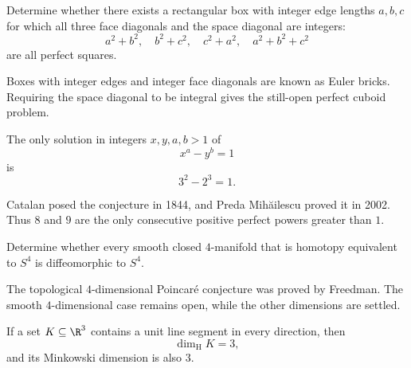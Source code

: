     \begin{openproblem}
        Determine whether there exists a rectangular box with integer edge
        lengths $a,b,c$ for which all three face diagonals and the space
        diagonal are integers:
        \[
            a^2+b^2,\quad
            b^2+c^2,\quad
            c^2+a^2,\quad
            a^2+b^2+c^2
        \]
        are all perfect squares.
    \end{openproblem}

    \begin{remark}
        Boxes with integer edges and integer face diagonals are known as Euler
        bricks. Requiring the space diagonal to be integral gives the still-open
        perfect cuboid problem.
    \end{remark}

    \begin{theorem}
        The only solution in integers $x,y,a,b>1$ of
        \[
            x^a-y^b=1
        \]
        is
        \[
            3^2-2^3=1.
        \]
    \end{theorem}

    \begin{remark}
        Catalan posed the conjecture in 1844, and Preda Mihăilescu proved it in
        2002. Thus $8$ and $9$ are the only consecutive positive perfect powers
        greater than $1$.
    \end{remark}

    \begin{openproblem}
        Determine whether every smooth closed $4$-manifold that is homotopy
        equivalent to $S^4$ is diffeomorphic to $S^4$.
    \end{openproblem}

    \begin{remark}
        The topological $4$-dimensional Poincaré conjecture was proved by
        Freedman. The smooth $4$-dimensional case remains open, while the other
        dimensions are settled.
    \end{remark}

    \begin{theorem}
        If a set $K\subseteq\R^3$ contains a unit line segment in every
        direction, then
        \[
            \dim_{\mathrm{H}}K=3,
        \]
        and its Minkowski dimension is also $3$.
    \end{theorem}

